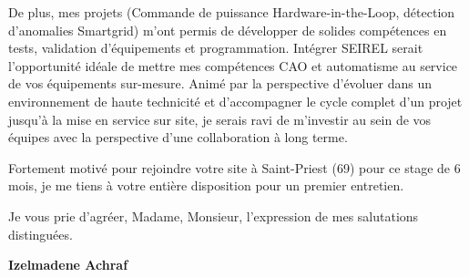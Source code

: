 \documentclass[10pt,a4paper]{../../altacv}
\begin{document}
\vspace{0.4cm}

De plus, mes projets (Commande de puissance Hardware-in-the-Loop, détection d'anomalies Smartgrid) m'ont permis de développer de solides compétences en tests, validation d'équipements et programmation. Intégrer SEIREL serait l'opportunité idéale de mettre mes compétences CAO et automatisme au service de vos équipements sur-mesure. Animé par la perspective d'évoluer dans un environnement de haute technicité et d'accompagner le cycle complet d'un projet jusqu'à la mise en service sur site, je serais ravi de m'investir au sein de vos équipes avec la perspective d'une collaboration à long terme.

\vspace{0.4cm}

Fortement motivé pour rejoindre votre site à Saint-Priest (69) pour ce stage de 6 mois, je me tiens à votre entière disposition pour un premier entretien.

\vspace{0.5cm}

Je vous prie d'agréer, Madame, Monsieur, l'expression de mes salutations distinguées.

\vfill

\begin{flushright}
  \Large\color{emphasis}\textbf{Izelmadene Achraf}
\end{flushright}
\end{document}
